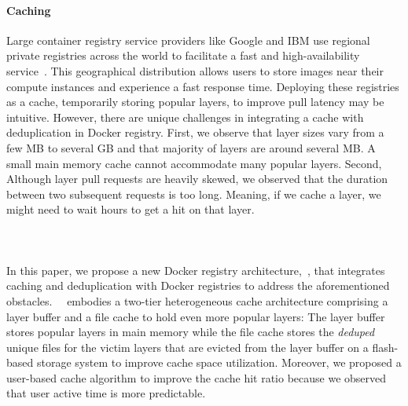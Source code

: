 
\paragraph{Caching}
Large container registry service providers like Google and IBM use regional private registries across the world to facilitate a fast and high-availability service~\cite{GoogleContainerRegistry,ibmregistry}.  
This geographical distribution allows users to store images near their compute instances and experience a fast response time. 
Deploying these registries as a cache, temporarily storing popular layers,
to improve pull latency may be intuitive.
However, there are unique challenges in integrating a cache with deduplication in Docker registry.
First, we observe that layer sizes vary from a few MB to several GB and that majority of layers are around several MB.
A small main memory cache cannot accommodate many popular layers.
Second, 
Although layer pull requests are heavily skewed, we observed that the duration between two subsequent requests is too long. 
Meaning, if we cache a layer, we might need to wait hours to get a hit on that layer.

\paragraph{~\sysname}
In this paper, we propose a new Docker registry architecture,~\sysname,
that integrates caching and deduplication with Docker registries to address the aforementioned obstacles.
~\sysname~embodies a two-tier heterogeneous cache architecture 
comprising a layer buffer and a file cache to hold even more popular layers:
The layer buffer stores popular layers in main memory while the file cache stores 
the \emph{deduped} unique files for the victim layers that are evicted from the layer buffer on a 
flash-based storage system to improve cache space utilization.
Moreover, we proposed a user-based cache algorithm to improve the cache hit ratio 
because we observed that user active time is more predictable.

